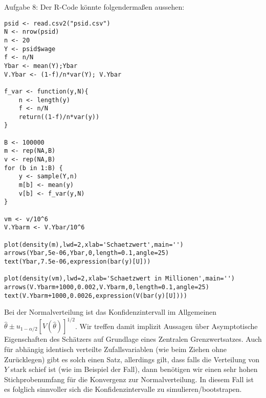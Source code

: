 \begin{Solution}{{Aufgabe 8:}}
Der R-Code könnte folgendermaßen aussehen:
\begin{lstlisting}
psid <- read.csv2("psid.csv")
N <- nrow(psid)
n <- 20
Y <- psid$wage
f <- n/N
Ybar <- mean(Y);Ybar
V.Ybar <- (1-f)/n*var(Y); V.Ybar

f_var <- function(y,N){
	n <- length(y)
	f <- n/N
	return((1-f)/n*var(y))
}

B <- 100000
m <- rep(NA,B)
v <- rep(NA,B)
for (b in 1:B) {
	y <- sample(Y,n)
	m[b] <- mean(y)
	v[b] <- f_var(y,N)
}

vm <- v/10^6
V.Ybarm <- V.Ybar/10^6

plot(density(m),lwd=2,xlab='Schaetzwert',main='')
arrows(Ybar,5e-06,Ybar,0,length=0.1,angle=25)
text(Ybar,7.5e-06,expression(bar(y)[U]))

plot(density(vm),lwd=2,xlab='Schaetzwert in Millionen',main='')
arrows(V.Ybarm+1000,0.002,V.Ybarm,0,length=0.1,angle=25)
text(V.Ybarm+1000,0.0026,expression(V(bar(y)[U])))
\end{lstlisting}
Bei der Normalverteilung ist das Konfidenzintervall im Allgemeinen $\hat{\theta} \pm u_{1-\alpha/2}[V(\hat{\theta})]^{1/2}$. Wir treffen damit implizit Aussagen über Asymptotische Eigenschaften des Schätzers auf Grundlage eines Zentralen Grenzwertsatzes. Auch für abhängig identisch verteilte Zufallsvariablen (wie beim Ziehen ohne Zurücklegen) gibt es solch einen Satz, allerdings gilt, dass falls die Verteilung von $Y$ stark schief ist (wie im Beispiel der Fall), dann benötigen wir einen sehr hohen Stichprobenumfang für die Konvergenz zur Normalverteilung. In diesem Fall ist es folglich sinnvoller sich die Konfidenzintervalle zu simulieren/bootstrapen.
\end{Solution}

